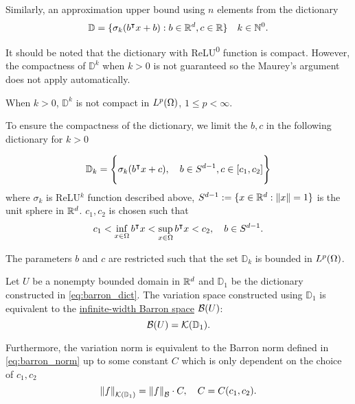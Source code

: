 Similarly, an approximation upper bound using $n$ elements from the dictionary 
\begin{equation}
    \mathbb{D} = \{
        \sigma_k(b{}^{\intercal} x + b): b\in\mathbb{R}^d, c\in\mathbb{R}
    \} \quad k \in \mathbb{N}^0.
\end{equation}

It should be noted that the dictionary with ReLU\textsuperscript{0} function is
compact. However, the compactness of $\mathbb{D}^k$ when $k > 0$ is not
guaranteed so the Maurey's argument does not apply automatically. 

\begin{proposition}
    When $k > 0$, $\mathbb{D}^k$ is not compact in $L^{p}(\Omega)$, $1 \leq p <
    \infty$.
\end{proposition}

To ensure the compactness of the dictionary, we limit the $b, c$ in the
following dictionary for $k>0$

\begin{equation}
    \label{eq:barron_dict}
    \mathbb{D}_{k} = \Bigg\{
        \sigma_k(b{}^{\intercal} x + c), \quad b\in S^{d-1}, c\in [c_1, c_2] 
    \Bigg\}
\end{equation}
where $\sigma_k$ is ReLU$^k$ function described above, $S^{d-1} := \{x\in\mathbb{R}^d:
\left\| x \right\| = 1\}$ is the unit sphere in $\mathbb{R}^d$. $c_1, c_2$ is chosen such that
\begin{equation}
    c_1 < \inf_{x\in\Omega} b{}^{\intercal} x < 
    \sup_{x\in\Omega} b{}^{\intercal} x < c_2, \quad
    b \in S^{d-1}.
\end{equation}

The parameters $b$ and $c$ are restricted such that the set $\mathbb{D}_k$ is
bounded in $L^{p}(\Omega)$.



\begin{proposition}
    Let $U$ be a nonempty bounded domain in $\mathbb{R}^d$ and $\mathbb{D}_1$ be the
    dictionary constructed in \eqref{eq:barron_dict}. The variation space
    constructed using $\mathbb{D}_1$ is equivalent to the
    \hyperref[def:barron_space]{infinite-width Barron space} $\mathcal{B}(U)$:
    \begin{equation}
        \mathcal{B}(U) = \mathcal{K}({\mathbb{D}_1}).
    \end{equation}
    
    Furthermore, the variation norm is equivalent to the Barron norm defined in
    \eqref{eq:barron_norm} up to some constant $C$ which is only dependent on
    the choice of $c_1, c_2$
    \begin{equation}
        \left\| {f} \right\|_{\mathcal{K}({\mathbb{D}_1})} = \left\| f \right\|_{\mathcal{B}} \cdot C, \quad 
        C = C(c_1, c_2).
    \end{equation}
\end{proposition}

